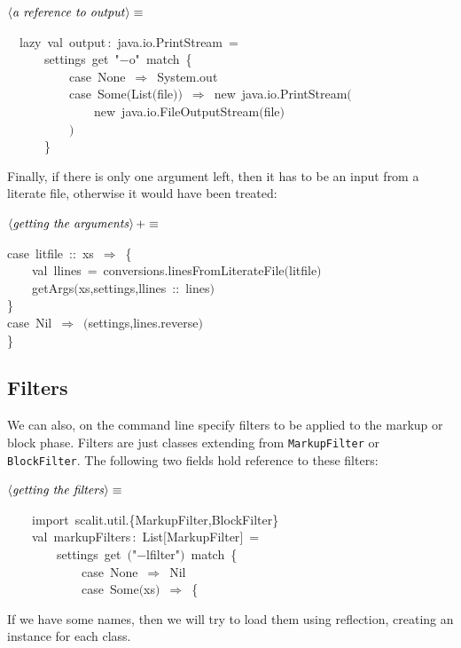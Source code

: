 \documentclass[a4paper,12pt]{article}
\begin{document}
$\left<\mbox{\emph{a reference to output}}\right>\equiv$
\begin{program}~~{\vem lazy}~{\vem val}~output\,{\rm :}~java.io.PrintStream~=
\\~~~~~~settings~get~"$-$o"~{\vem match}~{\small\{}
\\~~~~~~~~~~{\vem case}~None~$\Rightarrow$~System.out
\\~~~~~~~~~~{\vem case}~Some$($List$($file$)$$)$~$\Rightarrow$~{\vem new}~java.io.PrintStream$($
\\~~~~~~~~~~~~~~{\vem new}~java.io.FileOutputStream$($file$)$
\\~~~~~~~~~~$)$
\\~~~~~~{\small\}}
\\[0.5em]\end{program}
Finally, if there is only one argument left, then it has to be
an input from a literate file, otherwise it would have been treated:

$\left<\mbox{\emph{getting the arguments}}\right>+\equiv$
\begin{program}{\vem case}~litfile~{\rm :}{\rm :}~xs~$\Rightarrow$~{\small\{}
\\~~~~{\vem val}~llines~=~conversions.linesFromLiterateFile$($litfile$)$
\\~~~~getArgs$($xs,settings,llines~{\rm :}{\rm :}~lines$)$
\\{\small\}}
\\{\vem case}~Nil~$\Rightarrow$~$($settings,lines.reverse$)$
\\{\small\}}
\\[0.5em]\end{program}
\subsection{Filters}
We can also, on the command line specify filters to be applied to the
markup or block phase. Filters are just classes extending from
\texttt{MarkupFilter} or \texttt{BlockFilter}. The following two fields hold
reference to these filters:

$\left<\mbox{\emph{getting the filters}}\right>\equiv$
\begin{program}~~~~{\vem import}~scalit.util.{\small\{}MarkupFilter,BlockFilter{\small\}}
\\~~~~{\vem val}~markupFilters\,{\rm :}~List$[$MarkupFilter$]$~=
\\~~~~~~~~settings~get~$($"$-$lfilter"$)$~{\vem match}~{\small\{}
\\~~~~~~~~~~~~{\vem case}~None~$\Rightarrow$~Nil
\\~~~~~~~~~~~~{\vem case}~Some$($xs$)$~$\Rightarrow$~{\small\{}
\\[0.5em]\end{program}
If we have some names, then we will try to load them using reflection,
creating an instance for each class.
\end{document}
